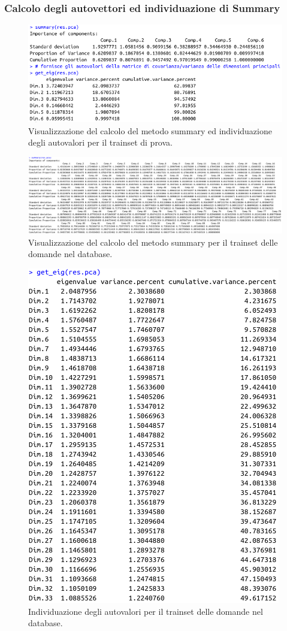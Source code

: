 \subsubsection{Calcolo degli autovettori ed individuazione di Summary}
\label{Calcolo degli autovettori ed individuazione di Summary}
\begin{figure}[H]
\centering
	\includegraphics[width=0.80\linewidth]{../../PCA/plot/summary-autovalore_rete-prova.png}
	\caption{Visualizzazione del calcolo del metodo summary ed individuazione degli autovalori per il trainset di prova.}
	\label{Visualizzazione del calcolo del metodo summary ed individuazione degli autovalori per il trainset di prova.}
\end{figure}
\begin{figure}[H]
\centering
	\includegraphics[width=1\linewidth]{../../PCA/plot/summary_db.png}
	\caption{Visualizzazione del calcolo del metodo summary per il trainset delle domande nel database.}
	\label{Visualizzazione del calcolo del metodo summary per il trainset delle domande nel database.}
\end{figure}
\begin{figure}[H]
\centering
	\includegraphics[width=0.60\linewidth]{../../PCA/plot/autovalori_db.png}
	\caption{Individuazione degli autovalori per il trainset delle domande nel database.}
	\label{Individuazione degli autovalori per il trainset delle domande nel database.}
\end{figure}

